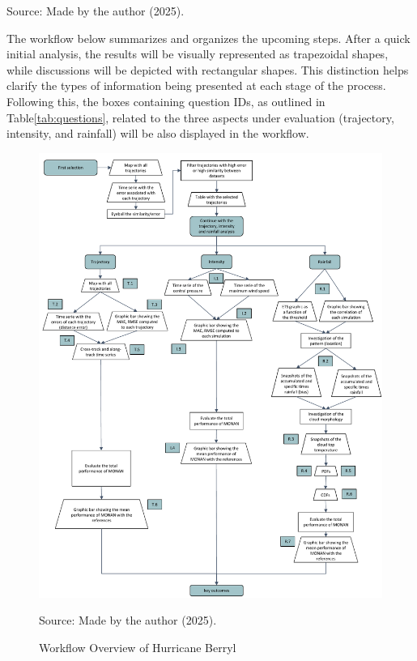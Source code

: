 \begin{table}[H]
	\vspace{2mm}
	{\centering Source: Made by the author (2025).\par}
	
\end{table}

The workflow below summarizes and organizes the upcoming steps. After a quick initial analysis, the results will be visually represented as trapezoidal shapes, while discussions will be depicted with rectangular shapes. This distinction helps clarify the types of information being presented at each stage of the process. Following this, the boxes containing question IDs, as outlined in Table\ref{tab:questions}, related to the three aspects under evaluation (trajectory, intensity, and rainfall) will be also displayed in the workflow.

\begin{figure}[p]
    \centering
    \caption{Workflow Overview of Hurricane Berryl}
    \label{fig:workflow}\includegraphics[width=\textwidth,height=\textheight,keepaspectratio]{docs/figuras/chapter4/BERYL_worflow_01.pdf}

    \vspace{0.5em}
    
    \centering
    Source: Made by the author (2025).
\end{figure}

